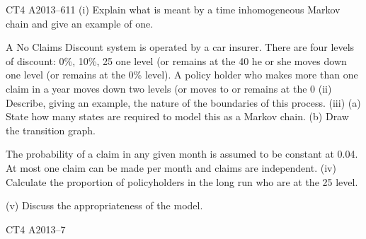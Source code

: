 \documentclass[a4paper,12pt]{article}
\begin{document}
\begin{enumerate}

CT4 A2013–611
(i)
Explain what is meant by a time inhomogeneous Markov chain and give an
example of one.

A No Claims Discount system is operated by a car insurer. There are four levels of
discount: 0\%, 10\%, 25%
one level (or remains at the 40%
he or she moves down one level (or remains at the 0\% level). A policy holder who
makes more than one claim in a year moves down two levels (or moves to or remains
at the 0%
(ii) Describe, giving an example, the nature of the boundaries of this process. 
(iii) (a)
State how many states are required to model this as a Markov chain.
(b)
Draw the transition graph.

The probability of a claim in any given month is assumed to be constant at 0.04. At
most one claim can be made per month and claims are independent.
(iv) Calculate the proportion of policyholders in the long run who are at the 25%
level.

(v) Discuss the appropriateness of the model.

CT4 A2013–7


\newpage



\end{enumerate}
\end{document}
